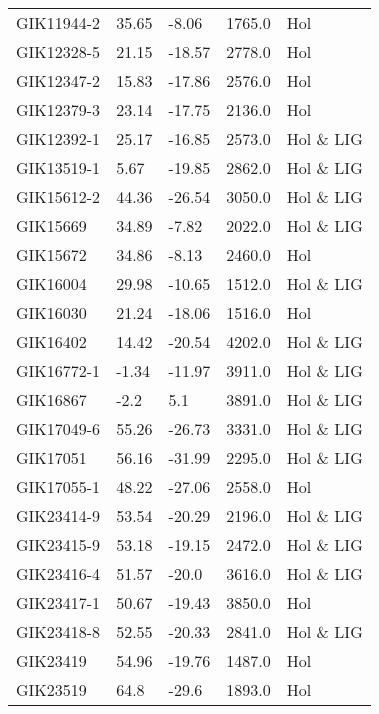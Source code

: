 \begin{longtable}{lllrl}
       GIK11944-2 &    35.65 &     -8.06 &     1765.0 &         Hol \\
       GIK12328-5 &    21.15 &    -18.57 &     2778.0 &         Hol \\
       GIK12347-2 &    15.83 &    -17.86 &     2576.0 &         Hol \\
       GIK12379-3 &    23.14 &    -17.75 &     2136.0 &         Hol \\
       GIK12392-1 &    25.17 &    -16.85 &     2573.0 &   Hol \& LIG \\
       GIK13519-1 &     5.67 &    -19.85 &     2862.0 &   Hol \& LIG \\
       GIK15612-2 &    44.36 &    -26.54 &     3050.0 &   Hol \& LIG \\
         GIK15669 &    34.89 &     -7.82 &     2022.0 &   Hol \& LIG \\
         GIK15672 &    34.86 &     -8.13 &     2460.0 &         Hol \\
         GIK16004 &    29.98 &    -10.65 &     1512.0 &   Hol \& LIG \\
         GIK16030 &    21.24 &    -18.06 &     1516.0 &         Hol \\
         GIK16402 &    14.42 &    -20.54 &     4202.0 &   Hol \& LIG \\
       GIK16772-1 &    -1.34 &    -11.97 &     3911.0 &   Hol \& LIG \\
         GIK16867 &     -2.2 &       5.1 &     3891.0 &   Hol \& LIG \\
       GIK17049-6 &    55.26 &    -26.73 &     3331.0 &   Hol \& LIG \\
         GIK17051 &    56.16 &    -31.99 &     2295.0 &   Hol \& LIG \\
       GIK17055-1 &    48.22 &    -27.06 &     2558.0 &         Hol \\
       GIK23414-9 &    53.54 &    -20.29 &     2196.0 &   Hol \& LIG \\
       GIK23415-9 &    53.18 &    -19.15 &     2472.0 &   Hol \& LIG \\
       GIK23416-4 &    51.57 &     -20.0 &     3616.0 &   Hol \& LIG \\
       GIK23417-1 &    50.67 &    -19.43 &     3850.0 &         Hol \\
       GIK23418-8 &    52.55 &    -20.33 &     2841.0 &   Hol \& LIG \\
         GIK23419 &    54.96 &    -19.76 &     1487.0 &         Hol \\
         GIK23519 &     64.8 &     -29.6 &     1893.0 &         Hol \\

\end{longtable}

